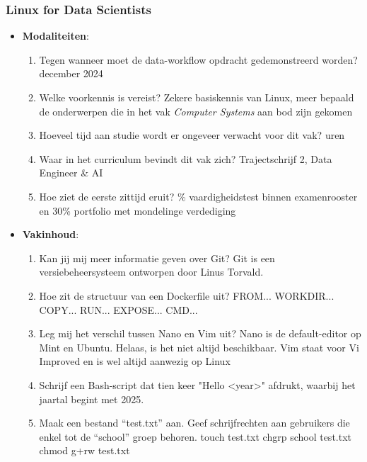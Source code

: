 \subsubsection{Linux for Data Scientists}

\begin{itemize}
    \item \textbf{Modaliteiten}: \begin{enumerate}
        \item Tegen wanneer moet de data-workflow opdracht gedemonstreerd worden?  december 2024
        \item  Welke voorkennis is vereist? \rightarrow Zekere basiskennis van Linux, meer bepaald de onderwerpen die in het vak \emph{Computer Systems} aan bod zijn gekomen
        \item Hoeveel tijd aan studie wordt er ongeveer verwacht voor dit vak? uren
        \item Waar in het curriculum bevindt dit vak zich? \rightarrow Trajectschrijf 2, Data Engineer \& AI
        \item Hoe ziet de eerste zittijd eruit? \% vaardigheidstest binnen examenrooster en 30\% portfolio met mondelinge verdediging
    \end{enumerate}
    \item \textbf{Vakinhoud}: \begin{enumerate}
        \item Kan jij mij meer informatie geven over Git? \rightarrow Git is een versiebeheersysteem ontworpen door Linus Torvald.
        \item Hoe zit de structuur van een Dockerfile uit? \rightarrow FROM... WORKDIR... COPY... RUN... EXPOSE... CMD...
        \item Leg mij het verschil tussen Nano en Vim uit? \rightarrow Nano is de default-editor op Mint en Ubuntu. Helaas, is het niet altijd beschikbaar. Vim staat voor Vi Improved en is wel altijd aanwezig op Linux
        \item Schrijf een Bash-script dat tien keer "Hello <year>" afdrukt, waarbij het jaartal begint met 2025. \rightarrow 
        \item Maak een bestand ``test.txt'' aan. Geef schrijfrechten aan gebruikers die enkel tot de ``school'' groep behoren. \rightarrow
        touch test.txt chgrp school test.txt chmod g+rw test.txt
    \end{enumerate}
\end{itemize}

